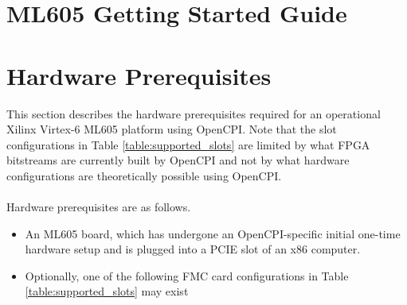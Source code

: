 \documentclass{article}
\begin{document}
\section*{ML605 Getting Started Guide}
\setcounter{section}{0}
\section{Hardware Prerequisites}
This section describes the hardware prerequisites required for an operational Xilinx Virtex-6 ML605 platform using OpenCPI. Note that the slot configurations in Table \ref{table:supported_slots} are limited by what FPGA bitstreams are currently built by OpenCPI and not by what hardware configurations are theoretically possible using OpenCPI.\\ \\
Hardware prerequisites are as follows.
\begin{itemize}
\item An ML605 board, which has undergone an OpenCPI-specific initial one-time hardware setup \cite{ml605_hardware_setup} and is plugged into a PCIE slot of an x86 computer.
\item Optionally, one of the following FMC card configurations in Table  \ref{table:supported_slots} may exist
\end{itemize}
\end{document}
